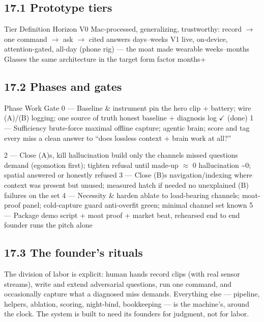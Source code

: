 \subsection{17.1 Prototype tiers}\label{prototype-tiers}

Tier Definition Horizon V0 Mac-processed, generalizing, trustworthy: record \(\rightarrow\) one command \(\rightarrow\) ask \(\rightarrow\) cited answers days--weeks V1 live, on-device, attention-gated, all-day (phone rig) --- the moat made wearable weeks--months Glasses the same architecture in the target form factor months+

\subsection{17.2 Phases and gates}\label{phases-and-gates}

Phase Work Gate 0 --- Baseline \& instrument pin the hero clip + battery; wire (A)/(B) logging; one source of truth honest baseline + diagnosis log \(\checkmark\) (done) 1 --- Sufficiency brute-force maximal offline capture; agentic brain; score and tag every miss a clean answer to ``does lossless context + brain work at all?''

2 --- Close (A)s, kill hallucination build only the channels missed questions demand (egomotion first); tighten refusal until made-up \(\approx\) 0 hallucination \textasciitilde0; spatial answered or honestly refused 3 --- Close (B)s navigation/indexing where context was present but unused; measured hatch if needed no unexplained (B) failures on the set 4 --- Necessity \& harden ablate to load-bearing channels; moat-proof panel; cold-capture guard anti-overfit green; minimal channel set known 5 --- Package demo script + moat proof + market beat, rehearsed end to end founder runs the pitch alone

\subsection{17.3 The founder's rituals}\label{the-founders-rituals}

The division of labor is explicit: human hands record clips (with real sensor streams), write and extend adversarial questions, run one command, and occasionally capture what a diagnosed miss demands. Everything else --- pipeline, helpers, ablation, scoring, night-bind, bookkeeping --- is the machine's, around the clock. The system is built to need its founders for judgment, not for labor.

